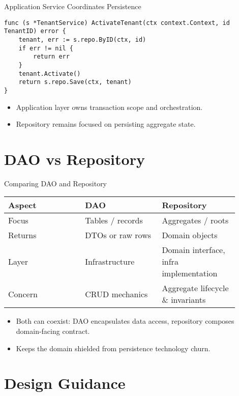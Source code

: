 \documentclass{beamer}
\begin{document}
\begin{frame}[fragile]{Application Service Coordinates Persistence}
  \begin{lstlisting}
func (s *TenantService) ActivateTenant(ctx context.Context, id TenantID) error {
    tenant, err := s.repo.ByID(ctx, id)
    if err != nil {
        return err
    }
    tenant.Activate()
    return s.repo.Save(ctx, tenant)
}
  \end{lstlisting}
  \begin{itemize}
    \item Application layer owns transaction scope and orchestration.
    \item Repository remains focused on persisting aggregate state.
  \end{itemize}
\end{frame}

\section{DAO vs Repository}

\begin{frame}{Comparing DAO and Repository}
  \begin{tabular}{p{0.3\linewidth}p{0.3\linewidth}p{0.3\linewidth}}
    \textbf{Aspect} & \textbf{DAO} & \textbf{Repository} \\
    \hline
    Focus & Tables / records & Aggregates / roots \\
    Returns & DTOs or raw rows & Domain objects \\
    Layer & Infrastructure & Domain interface, infra implementation \\
    Concern & CRUD mechanics & Aggregate lifecycle \& invariants \\
  \end{tabular}
  \vspace{0.5em}
  \begin{itemize}
    \item Both can coexist: DAO encapsulates data access, repository composes domain-facing contract.
    \item Keeps the domain shielded from persistence technology churn.
  \end{itemize}
\end{frame}

\section{Design Guidance}
\end{document}
